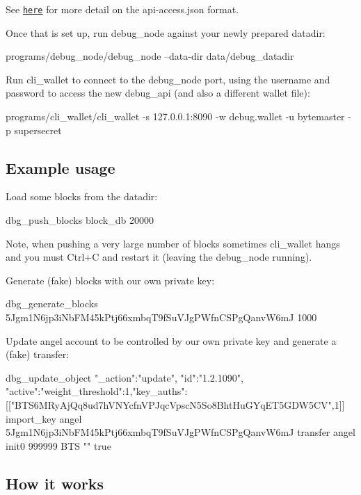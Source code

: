 See \href{https://github.com/cryptonomex/graphene#accessing-restricted-apis}{\tt here} for more detail on the {\ttfamily api-\/access.\+json} format.

Once that is set up, run {\ttfamily debug\+\_\+node} against your newly prepared datadir\+: \begin{DoxyVerb}programs/debug_node/debug_node --data-dir data/debug_datadir
\end{DoxyVerb}


Run {\ttfamily cli\+\_\+wallet} to connect to the {\ttfamily debug\+\_\+node} port, using the username and password to access the new {\ttfamily debug\+\_\+api} (and also a different wallet file)\+: \begin{DoxyVerb}programs/cli_wallet/cli_wallet -s 127.0.0.1:8090 -w debug.wallet -u bytemaster -p supersecret
\end{DoxyVerb}


\subsection*{Example usage }

Load some blocks from the datadir\+: \begin{DoxyVerb}dbg_push_blocks block_db 20000
\end{DoxyVerb}


Note, when pushing a very large number of blocks sometimes {\ttfamily cli\+\_\+wallet} hangs and you must Ctrl+C and restart it (leaving the {\ttfamily debug\+\_\+node} running).

Generate (fake) blocks with our own private key\+: \begin{DoxyVerb}dbg_generate_blocks 5Jgm1N6jp3iNbFM45kPtj66xmbqT9fSuVJgPWfnCSPgQanvW6mJ 1000
\end{DoxyVerb}


Update {\ttfamily angel} account to be controlled by our own private key and generate a (fake) transfer\+: \begin{DoxyVerb}dbg_update_object {"_action":"update", "id":"1.2.1090", "active":{"weight_threshold":1,"key_auths":[["BTS6MRyAjQq8ud7hVNYcfnVPJqcVpscN5So8BhtHuGYqET5GDW5CV",1]]}}
import_key angel 5Jgm1N6jp3iNbFM45kPtj66xmbqT9fSuVJgPWfnCSPgQanvW6mJ
transfer angel init0 999999 BTS "" true
\end{DoxyVerb}


\subsection*{How it works }


